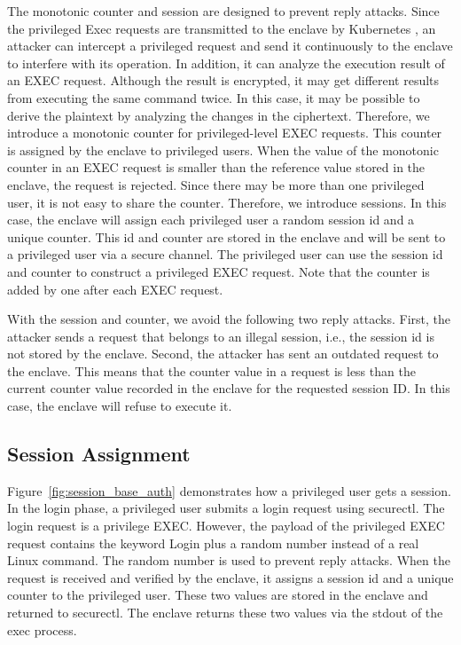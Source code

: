 The  monotonic counter and session are designed to prevent reply attacks. Since the privileged Exec requests are transmitted to the enclave by Kubernetes , an attacker can intercept a privileged request and send it continuously to the enclave to 
interfere with its operation. In addition, it can analyze the execution result of an EXEC request. Although the result is encrypted, it may get different results from executing the same command twice. In this case, it may be possible to derive the 
plaintext by analyzing the changes in the ciphertext.   Therefore, we introduce a monotonic counter for privileged-level EXEC requests. This counter is assigned by the enclave to privileged users. When the value of the monotonic counter in an EXEC 
request is smaller than the reference value stored in the enclave, the request is rejected. Since there may be more than one privileged user, it is not easy to share the counter. Therefore, we introduce sessions. In this case, the enclave will 
assign each privileged user a random session id and a unique counter. This id and counter are stored in the enclave and will be sent to a privileged user via a secure channel. The privileged user can use the session id and counter to construct a 
privileged EXEC request. Note that the counter is added by one after each EXEC request.


With the session and counter, we avoid the following two reply attacks. First, the attacker sends a request that belongs to an illegal session, i.e., the session id is not stored by the enclave. Second, the attacker has sent an outdated request to 
the enclave. This means that the counter value in a request is less than the current counter value recorded in the enclave for the requested session ID. In this case, the enclave will refuse to execute it.

\subsection{Session Assignment}

Figure~\ref{fig:session_base_auth} demonstrates how a privileged user gets a session. In the login phase, a privileged user submits a login request using securectl. The login request is a privilege EXEC. However, the payload of the privileged EXEC 
request contains the keyword Login plus a random number instead of a real Linux command. The random number is used to prevent reply attacks. When the request is received and verified by the enclave,  it assigns a session id and a unique counter to 
the privileged user. These two values are stored in the enclave and returned to securectl. The enclave returns these two values via the stdout of the exec process.

